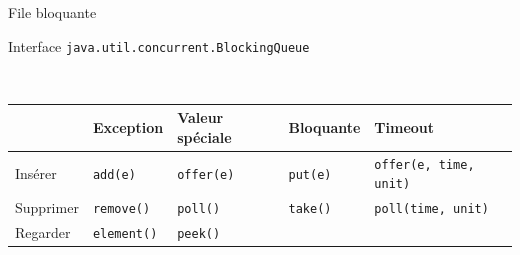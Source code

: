 
\begingroup

\begin{frame}{File bloquante}

  \vfill
  \begin{exampleblock}{Interface \lstinline{java.util.concurrent.BlockingQueue}}~

    \vfill

    ~\hspace{-5mm}\begin{tabular}{|l|l|l|l|l|}
      \hline
      & Exception & Valeur spéciale & Bloquante & Timeout\\
      \hline
      Insérer & \lstinline+add(e)+ & \lstinline+offer(e)+ & \lstinline+put(e)+ & \lstinline+offer(e, time, unit)+  \\
      \hline
      Supprimer & \lstinline+remove()+ & \lstinline+poll()+ & \lstinline+take()+ & \lstinline+poll(time, unit)+ \\
      \hline
      Regarder & \lstinline+element()+ & \lstinline+peek()+ &  &  \\
      \hline
    \end{tabular}
  \end{exampleblock}

  \vfill
\end{frame}

\endgroup
\endinput
